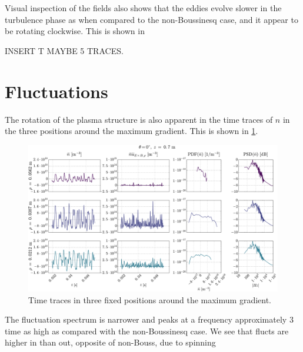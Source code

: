 Visual inspection of the fields also shows that the eddies evolve slower in the turbulence phase as when compared to the non-Boussinesq case, and it appear to be rotating clockwise.
This is shown in

INSERT T MAYBE 5 TRACES.

\section{Fluctuations}
%
The rotation of the plasma structure is also apparent in the time traces of $n$ in the three positions around the maximum gradient.
This is shown in \cref{fig:comb008B}.
%
\begin{figure}[htb]
    \centering
    \includegraphics[width=1.0\textwidth]{fig/results/compareBouss/comb008B}
    \caption{Time traces in three fixed positions around the maximum gradient.}
    \label{fig:comb008B}
\end{figure}
%
The fluctuation spectrum is narrower and peaks at a frequency approximately $3$ time as high as compared with the non-Boussinesq case.
We see that flucts are higher in than out, opposite of non-Bouss, due to spinning

